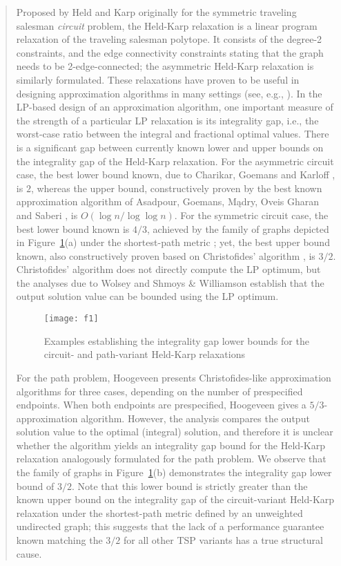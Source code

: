 \documentclass[11pt,letterpaper]{article}
\begin{document}
\begin{quote}
Proposed by Held and Karp \cite{HK} originally for the symmetric traveling salesman \emph{circuit} problem, the Held-Karp relaxation is a linear program relaxation of the traveling salesman polytope. It consists of the degree-2 constraints, and the edge connectivity constraints stating that the graph needs to be 2-edge-connected; the asymmetric Held-Karp relaxation is similarly formulated. These relaxations have proven to be useful in designing approximation algorithms in many settings (see, e.g., \cite{AGMOS, AKS, OSS, MS}). In the LP-based design of an approximation algorithm, one important measure of the strength of a particular LP relaxation is its integrality gap, i.e., the worst-case ratio between the integral and fractional optimal values. There is a significant gap between currently known lower and upper bounds on the integrality gap of the Held-Karp relaxation. For the asymmetric circuit case, the best lower bound known, due to Charikar, Goemans and Karloff \cite{CGK}, is $2$, whereas the upper bound, constructively proven by the best known approximation algorithm of Asadpour, Goemans, M{\k{a}}dry, Oveis Gharan and Saberi \cite{AGMOS}, is $O(\log n/\log\log n)$. For the symmetric circuit case, the best lower bound known is $4/3$, achieved by the family of graphs depicted in Figure~\mbox{\ref{f:1}(a)} under the shortest-path metric \cite{G}; yet, the best upper bound known, also constructively proven \cite{W, SW} based on Christofides' algorithm \cite{C}, is $3/2$. Christofides' algorithm does not directly compute the LP optimum, but the analyses due to Wolsey \cite{W} and Shmoys \& Williamson \cite{SW} establish that the output solution value can be bounded using the LP optimum. 

\begin{figure}
\label{f:1}
\center
\texttt{[image: f1]}
\caption{Examples establishing the integrality gap lower bounds for the circuit- and path-variant Held-Karp relaxations}
\end{figure}

For the path problem, Hoogeveen \cite{H} presents Christofides-like approximation algorithms for three cases, depending on the number of prespecified endpoints.  When both endpoints are prespecified, Hoogeveen \cite{H} gives a $5/3$-approximation algorithm. However, the analysis compares the output solution value to the optimal (integral) solution, and therefore it is unclear whether the algorithm yields an integrality gap bound for the Held-Karp relaxation analogously formulated for the path problem. We observe that the family of graphs in Figure~\mbox{\ref{f:1}(b)} demonstrates the integrality gap lower bound of $3/2$. Note that this lower bound is strictly greater than the known upper bound on the integrality gap of the circuit-variant Held-Karp relaxation under the shortest-path metric defined by an unweighted undirected graph; this suggests that the lack of a performance guarantee known matching the $3/2$ for all other TSP variants has a true structural cause.


\end{quote}
\end{document}
